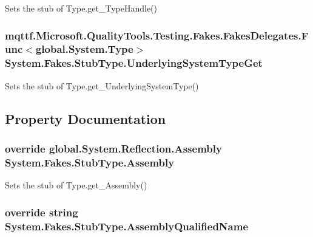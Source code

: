 Sets the stub of Type.\-get\-\_\-\-Type\-Handle()

\hypertarget{class_system_1_1_fakes_1_1_stub_type_a3053929de40e46581d25619cb6c47495}{
\subsubsection[{Underlying\-System\-Type\-Get}]{\setlength{\rightskip}{0pt plus 5cm}mqttf.\-Microsoft.\-Quality\-Tools.\-Testing.\-Fakes.\-Fakes\-Delegates.\-Func$<$global.\-System.\-Type$>$ System.\-Fakes.\-Stub\-Type.\-Underlying\-System\-Type\-Get}}\label{class_system_1_1_fakes_1_1_stub_type_a3053929de40e46581d25619cb6c47495}


Sets the stub of Type.\-get\-\_\-\-Underlying\-System\-Type()



\subsection{Property Documentation}
\hypertarget{class_system_1_1_fakes_1_1_stub_type_ac07d583a84ae3517815638650eda773b}{
\subsubsection[{Assembly}]{\setlength{\rightskip}{0pt plus 5cm}override global.\-System.\-Reflection.\-Assembly System.\-Fakes.\-Stub\-Type.\-Assembly\hspace{0.3cm}{\ttfamily [get]}}}\label{class_system_1_1_fakes_1_1_stub_type_ac07d583a84ae3517815638650eda773b}


Sets the stub of Type.\-get\-\_\-\-Assembly()

\hypertarget{class_system_1_1_fakes_1_1_stub_type_a1bdcdf1ca504d3cf6b8dcd8273fe8815}{
\subsubsection[{Assembly\-Qualified\-Name}]{\setlength{\rightskip}{0pt plus 5cm}override string System.\-Fakes.\-Stub\-Type.\-Assembly\-Qualified\-Name\hspace{0.3cm}{\ttfamily [get]}}}\label{class_system_1_1_fakes_1_1_stub_type_a1bdcdf1ca504d3cf6b8dcd8273fe8815}


